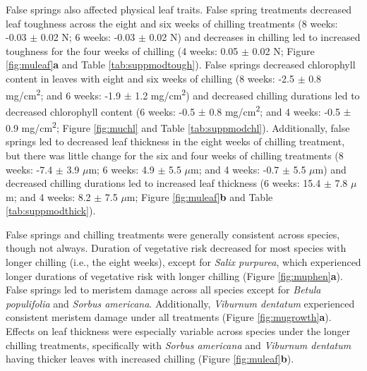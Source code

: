 \documentclass{article}\usepackage[]{graphicx}\usepackage[]{color}
\begin{document}
False springs also affected physical leaf traits. False spring treatments decreased leaf toughness across the eight and six weeks of chilling treatments (8 weeks: -0.03 $\pm$ 0.02 N; 6 weeks: -0.03 $\pm$ 0.02 N) and decreases in chilling led to increased toughness for the four weeks of chilling (4 weeks: 0.05 $\pm$ 0.02 N; Figure \ref{fig:muleaf}\textbf{a} and Table \ref{tab:suppmodtough}). False springs decreased chlorophyll content in leaves with eight and six weeks of chilling (8 weeks: -2.5 $\pm$ 0.8 mg/cm\textsuperscript{2}; and 6 weeks: -1.9 $\pm$ 1.2 mg/cm\textsuperscript{2}) and decreased chilling durations led to decreased chlorophyll content (6 weeks: -0.5 $\pm$ 0.8 mg/cm\textsuperscript{2}; and 4 weeks: -0.5 $\pm$ 0.9 mg/cm\textsuperscript{2}; Figure \ref{fig:muchl} and Table \ref{tab:suppmodchl}). Additionally, false springs led to decreased leaf thickness in the eight weeks of chilling treatment, but there was little change for the six and four weeks of chilling treatments (8 weeks: -7.4 $\pm$ 3.9 $\mu$m; 6 weeks: 4.9 $\pm$ 5.5 $\mu$m; and 4 weeks: -0.7 $\pm$ 5.5 $\mu$m) and decreased chilling durations led to increased leaf thickness (6 weeks: 15.4 $\pm$ 7.8 $\mu$m; and 4 weeks: 8.2 $\pm$ 7.5 $\mu$m; Figure \ref{fig:muleaf}\textbf{b} and Table \ref{tab:suppmodthick}). 
  
False springs and chilling treatments were generally consistent across species, though not always. Duration of vegetative risk decreased for most species with longer chilling (i.e., the eight weeks), except for \textit{Salix purpurea}, which experienced longer durations of vegetative risk with longer chilling (Figure \ref{fig:muphen}\textbf{a}). False springs led to meristem damage across all species except for \textit{Betula populifolia} and \textit{Sorbus americana}. Additionally, \textit{Viburnum dentatum} experienced consistent meristem damage under all treatments (Figure \ref{fig:mugrowth}\textbf{a}). Effects on leaf thickness were especially variable across species under the longer chilling treatments, specifically with \textit{Sorbus americana} and \textit{Viburnum dentatum} having thicker leaves with increased chilling (Figure \ref{fig:muleaf}\textbf{b}). 
  
\end{document}
